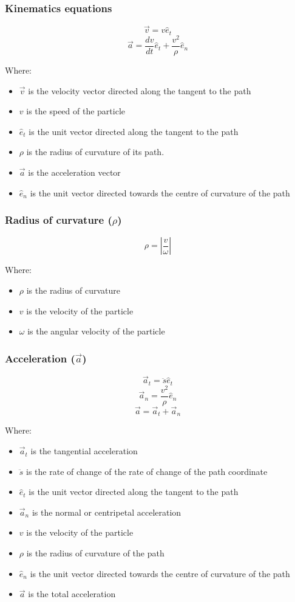 \documentclass[11pt]{article}
\begin{document}
\subsubsection{Kinematics equations}
\label{sec:org2005c96}
\[\vec{v} = v \hat{e}_t\]
\[\vec{a} = \frac{dv}{dt} \hat{e}_t + \frac{v^2}{\rho} \hat{e}_n\]

Where:
\begin{itemize}
\item \(\vec{v}\) is the velocity vector directed along the tangent to the path
\item \(v\) is the speed of the particle
\item \(\hat{e}_t\) is the unit vector directed along the tangent to the path
\item \(\rho\) is the radius of curvature of its path.
\item \(\vec{a}\) is the acceleration vector
\item \(\hat{e}_n\) is the unit vector directed towards the centre of curvature of the path
\end{itemize}
\subsubsection{Radius of curvature (\(\rho\))}
\label{sec:orgb833c8f}
\[\rho = \left| \frac{v}{\omega} \right|\]

Where:
\begin{itemize}
\item \(\rho\) is the radius of curvature
\item \(v\) is the velocity of the particle
\item \(\omega\) is the angular velocity of the particle
\end{itemize}
\subsubsection{Acceleration (\(\vec{a}\))}
\label{sec:orgcf9108c}
\[\vec{a}_t = \ddot{s} \hat{e}_t\]
\[\vec{a}_n = \frac{v^2}{\rho} \hat{e}_n\]
\[\vec{a} = \vec{a}_t + \vec{a}_n\]

Where:
\begin{itemize}
\item \(\vec{a}_t\) is the tangential acceleration
\item \(\ddot{s}\) is the rate of change of the rate of change of the path coordinate
\item \(\hat{e}_t\) is the unit vector directed along the tangent to the path
\item \(\vec{a}_n\) is the normal or centripetal acceleration
\item \(v\) is the velocity of the particle
\item \(\rho\) is the radius of curvature of the path
\item \(\hat{e}_n\) is the unit vector directed towards the centre of curvature of the path
\item \(\vec{a}\) is the total acceleration
\end{itemize}
\end{document}
